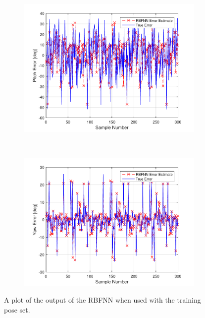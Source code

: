 \begin{figure}
\begin{subfigure}{0.3\textwidth}
    \includegraphics[width=\textwidth]{figures/chapter4/pitch_train}
    \caption{}
  \end{subfigure}
~
  \begin{subfigure}{0.3\textwidth}
    \includegraphics[width=\textwidth]{figures/chapter4/yaw_train}
    \caption{}
  \end{subfigure}
  \caption{A plot of the output of the RBFNN when used with the training pose set.}
  \label{fig:chap4-rbf-train}
\end{figure}


